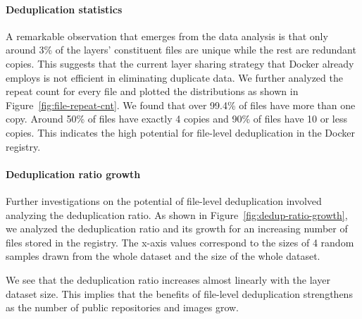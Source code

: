 \paragraph{Deduplication statistics} %

%
A remarkable observation that emerges from the data analysis is that only around 3\% of the layers' constituent files are unique while the rest are redundant copies. 
This suggests that the current layer sharing strategy that Docker already employs is not efficient in eliminating duplicate data. 
We further analyzed the repeat count for every file and plotted the distributions as shown in Figure~\ref{fig:file-repeat-cnt}.
We found that over 99.4\% of files have more than one copy.
Around 50\% of files have exactly 4 copies and 90\% of files have 10 or less copies. 
This indicates the high potential for file-level deduplication in the Docker registry.




\paragraph{Deduplication ratio growth} %
%
Further investigations on the potential of file-level deduplication involved analyzing the deduplication ratio. 
As shown in Figure~\ref{fig:dedup-ratio-growth}, we analyzed the deduplication 
ratio and its growth for an increasing number of files stored in the registry.   
%
%
The x-axis values correspond to the sizes of 4 random samples drawn from the whole dataset and the size of the
whole dataset.

We see that the deduplication ratio increases almost linearly with the layer dataset size.
This implies that the benefits of file-level deduplication strengthens as the number of public repositories and images grow.
%



